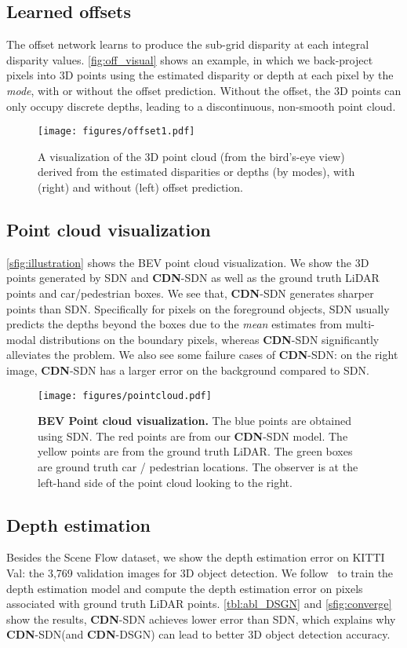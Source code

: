 \documentclass{article}
\newcommand{\method}[1]{\textsc{#1}}
\newcommand{\SDN}{\method{SDN}\xspace}
\newcommand{\DSGN}{\method{DSGN}\xspace}
\newcommand{\CDN}{\textbf{\method{CDN}}\xspace}
\begin{document}
\subsection{Learned offsets} The offset network learns to produce the sub-grid disparity at each integral disparity values. \autoref{fig:off_visual} shows an example, in which we back-project pixels into 3D points using the estimated disparity or depth at each pixel by the \emph{mode}, with or without the offset prediction. Without the offset, the 3D points can only occupy discrete depths, leading to a discontinuous, non-smooth point cloud.


\begin{figure}
\texttt{[image: figures/offset1.pdf]}
\caption{\small {A visualization of the 3D point cloud (from the bird's-eye view) derived from the estimated disparities or depths (by modes), with (right) and without (left) offset prediction.}
} \label{fig:off_visual}
\end{figure}



\subsection{Point cloud visualization}
\autoref{sfig:illustration} shows the BEV point cloud visualization. We show the 3D points generated by \SDN and \CDN-\SDN as well as the ground truth LiDAR points and car/pedestrian boxes. We see that, \CDN-\SDN generates sharper points than \SDN. Specifically for pixels on the foreground objects, \SDN usually predicts the depths beyond the boxes due to the \emph{mean} estimates from multi-modal distributions on the boundary pixels, whereas \CDN-\SDN significantly alleviates the problem. We also see some failure cases of \CDN-\SDN: on the right image, \CDN-\SDN has a larger error on the background compared to \SDN.

\begin{figure}
\centering
\texttt{[image: figures/pointcloud.pdf]}
\caption{\small\textbf{BEV Point cloud visualization.} The blue points are obtained using \SDN. The red points are from our \CDN-\SDN model. The yellow points are from the ground truth LiDAR. The green boxes are ground truth car / pedestrian locations. The observer is at the left-hand side of the point cloud looking to the right.}
\label{sfig:illustration}
\end{figure}


\subsection{Depth estimation}
Besides the Scene Flow dataset, we show the depth estimation error on KITTI Val: the 3,769 validation images for 3D object detection. We follow~\cite{you2019pseudo} to train the depth estimation model and compute the depth estimation error on pixels associated with ground truth LiDAR points. \autoref{tbl:abl_DSGN} and \autoref{sfig:converge} show the results, \CDN-\SDN achieves lower error than \SDN, which explains why \CDN-\SDN (and \CDN-\DSGN) can lead to better 3D object detection accuracy. 
\end{document}

